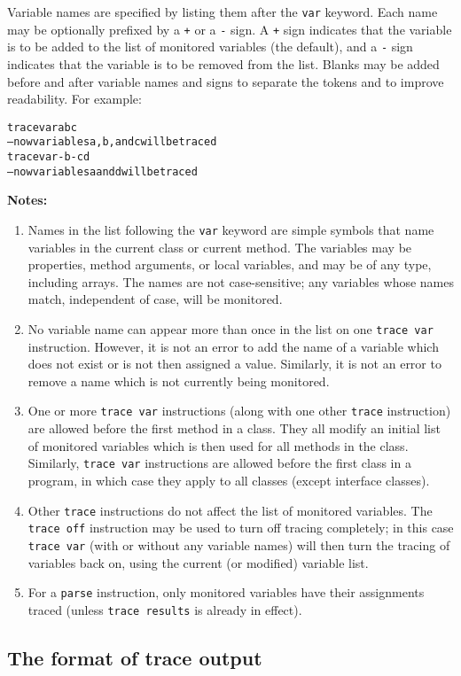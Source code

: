 Variable names are specified by listing them after the \texttt{var}
keyword.
Each name may be optionally prefixed by a \texttt{+} or a \texttt{-} sign.
A \texttt{+} sign indicates that the variable is to be added to the list
of monitored variables (the default), and a \texttt{-} sign indicates that
the variable is to be removed from the list.  Blanks may be added before
and after variable names and signs to separate the tokens and to improve
readability.
 For example:
\begin{alltt}
trace var a b c
-- now variables a, b, and c will be traced
trace var -b -c d
-- now variables a and d will be traced
\end{alltt}
 \textbf{Notes:}
\begin{enumerate}
\item 
Names in the list following the \texttt{var} keyword are simple symbols
that name variables in the current class or current method.
The variables may be properties, method arguments, or local variables,
and may be of any type, including arrays.
The names are not case-sensitive; any variables whose names match,
independent of case, will be monitored.
\item 
No variable name can appear more than once in the list on one
\texttt{trace var} instruction.  However, it is not an error to add the
name of a variable which does not exist or is not then assigned a value.
Similarly, it is not an error to remove a name which is not currently
being monitored.
\item 
One or more \texttt{trace var} instructions (along with one other
\texttt{trace} instruction) are allowed before the first method in a
class.  They all modify an initial list of monitored variables which
is then used for all methods in the class.  Similarly, \texttt{trace
var} instructions are allowed before the first class in a program,
in which case they apply to all classes (except interface classes).
\item 
Other \texttt{trace} instructions do not affect the list of monitored
variables.
The \texttt{trace off} instruction may be used to turn off tracing
completely; in this case \texttt{trace var} (with or without any
variable names) will then turn the tracing of variables back on, using
the current (or modified) variable list.
\item 
For a \texttt{parse} instruction, only monitored variables have their
assignments traced (unless \texttt{trace results} is already in effect).
\end{enumerate}
\subsection{The format of trace output}
 
